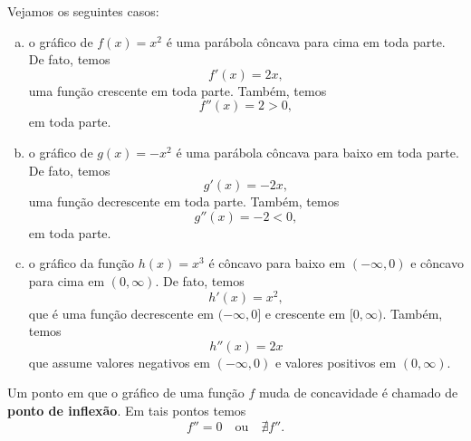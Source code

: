 \begin{ex}
  Vejamos os seguintes casos:
  \begin{enumerate}[a)]
  \item o gráfico de $f(x) = x^2$ é uma parábola côncava para cima em toda parte. De fato, temos
    \begin{equation}
      f'(x) = 2x,
    \end{equation}
    uma função crescente em toda parte. Também, temos
    \begin{equation}
      f''(x) = 2 > 0,
    \end{equation}
    em toda parte.
  \item o gráfico de $g(x) = -x^2$ é uma parábola côncava para baixo em toda parte. De fato, temos
    \begin{equation}
      g'(x) = -2x,
    \end{equation}
    uma função decrescente em toda parte. Também, temos
    \begin{equation}
      g''(x) = -2 < 0,
    \end{equation}
    em toda parte.
  \item o gráfico da função $h(x) = x^3$ é côncavo para baixo em $(-\infty, 0)$ e côncavo para cima em $(0, \infty)$. De fato, temos
    \begin{equation}
      h'(x) = x^2,
    \end{equation}
    que é uma função decrescente em $(-\infty, 0]$ e crescente em $[0, \infty)$. Também, temos
    \begin{equation}
      h''(x) = 2x
    \end{equation}
    que assume valores negativos em $(-\infty, 0)$ e valores positivos em $(0, \infty)$.
  \end{enumerate}
\end{ex}

Um ponto em que o gráfico de uma função $f$ muda de concavidade é chamado de {\bf ponto de inflexão}. Em tais pontos temos
\begin{equation}
  f'' = 0\quad\text{ou}\quad\nexists f''.
\end{equation}

